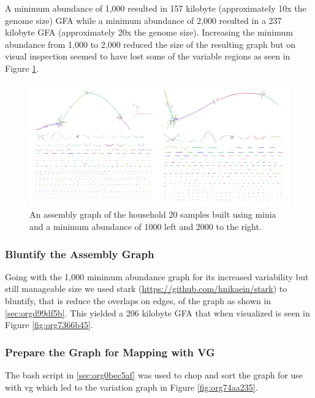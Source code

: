 \documentclass[10pt, a4paper]{article}
\begin{document}
A minimum abundance of 1,000 resulted in 157 kilobyte
(approximately 10x the genome size) GFA while a minimum abundance of 2,000 
resulted in a 237 kilobyte GFA (approximately 20x the genome size).
Increasing the minimum abundance from 1,000 to 2,000 reduced the size of the 
resulting graph but on visual inspection seemed to have lost some of 
the variable regions as seen in Figure \ref{fig:orgc0a4a56}.

\begin{figure}[h]
\centering
\includegraphics[scale=1.0]{../Figures/RSV/Assembly_Combined.png}
\caption[RSV Assembly Graph]{\label{fig:orgc0a4a56}An assembly graph of the household 20 samples built using minia and a minimum abundance of 1000 left and 2000 to the right.}
\end{figure}

\subsubsection{Bluntify the Assembly Graph}
\label{sec:orgf8e04a9}
Going with the 1,000 minimum abundance graph for its increased variability but 
still manageable size we used stark (\url{https://github.com/hnikaein/stark}) to 
bluntify, that is reduce the overlaps on edges,
 \cite{gargGraphbasedApproachDiploid2018} of the graph as shown in
\ref{sec:orgd99df5b}.
This yielded a 206 kilobyte GFA that when visualized is seen in Figure
\ref{fig:org7366b45}.

\subsubsection{Prepare the Graph for Mapping with VG}
\label{sec:org7657acb}
The bash script in \ref{sec:org0bec5af} was used to chop and sort the graph
for use with vg \cite{garrisonVariationGraphToolkit2018} which led to the 
variation graph in Figure \ref{fig:org74aa235}.
\end{document}
